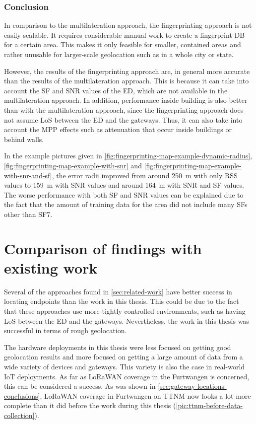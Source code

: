 \subsubsection{Conclusion}

In comparison to the multilateration approach, the fingerprinting approach is not easily scalable.
It requires considerable manual work to create a fingerprint \ac{DB} for a certain area.
This makes it only feasible for smaller, contained areas and rather unusable for larger-scale geolocation such as in a whole city or state.

However, the results of the fingerprinting approach are, in general more accurate than the results of the multilateration approach.
This is because it can take into account the \ac{SF} and \ac{SNR} values of the \acl{ED}, which are not available in the multilateration approach.
In addition, performance inside building is also better than with the multilateration approach, since the fingerprinting approach does not assume \ac{LoS} between the \acl{ED} and the gateways.
Thus, it can also take into account the \ac{MPP} effects such as attenuation that occur inside buildings or behind walls.

In the example pictures given in \cref{fig:fingerprinting-map-example-dynamic-radius}, \cref{fig:fingerprinting-map-example-with-snr} and \cref{fig:fingerprinting-map-example-with-snr-and-sf}, the error radii improved from around \SI{250}{\meter} with only \ac{RSS} values to \SI{159}{\meter} with \ac{SNR} values and around \SI{164}{\meter} with \ac{SNR} and \ac{SF} values.
The worse performance with both \ac{SF} and \ac{SNR} values can be explained due to the fact that the amount of training data for the area did not include many \aclp{SF} other than \acs{SF}7.

\section{Comparison of findings with existing work}

Several of the approaches found in \cref{sec:related-work} have better success in locating endpoints than the work in this thesis.
This could be due to the fact that these approaches use more tightly controlled environments, such as having \ac{LoS} between the \acl{ED} and the gateways.
Nevertheless, the work in this thesis was successful in terms of rough geolocation.

The hardware deployments in this thesis were less focused on getting good geolocation results and more focused on getting a large amount of data from a wide variety of devices and gateways.
This variety is also the case in real-world \ac{IoT} deployments.
As far as \ac{LoRaWAN} coverage in the Furtwangen is concerned, this can be considered a success.
As was shown in \cref{sec:gateway-locations-conclusions}, \ac{LoRaWAN} coverage in Furtwangen on \ac{TTNM} now looks a lot more complete than it did before the work during this thesis (\cref{pic:ttnm-before-data-collection}).

